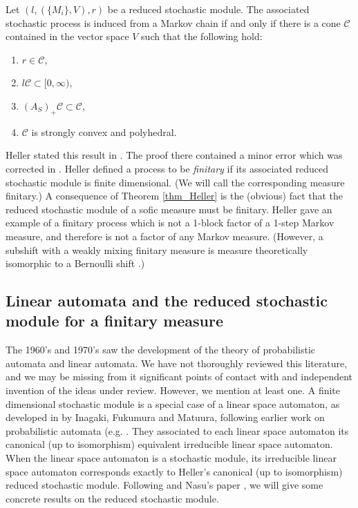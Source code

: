 \documentclass{kepart2010}
\theoremstyle{plain}
\theoremstyle{definition}
\theoremstyle{remark}
\theoremstyle{definition}
\numberwithin{equation}{section}
\begin{document}
\begin{thm}\label{thm_Heller}
Let $(l,(\{M_i\},V),r)$ be a reduced stochastic module.
The associated stochastic process is induced from a
Markov chain if and only if there is a cone $\mathcal C$
contained in the vector space $V$  such that the following hold:
\begin{enumerate}
\item
 $r\in \mathcal C$,
\item
 $l\mathcal C \subset [0,\infty )$,
\item
$(A_S)_+ \mathcal C \subset \mathcal C$,
\item
 $\mathcal C$ is strongly convex and  polyhedral.
\end{enumerate}
\end{thm}
Heller stated this result in \cite[Theorem 1]{Heller1965}. The proof
there contained a minor error which was corrected in
\cite{Heller1967}. Heller defined a process to be {\em finitary} if
its associated reduced stochastic module is finite dimensional. (We
will call the corresponding measure finitary.) A consequence of
Theorem \ref{thm_Heller} is the (obvious) fact that the reduced
stochastic module of a sofic measure must be finitary. Heller gave
an example \cite{Heller1965} of a finitary process which is not a
1-block factor of a 1-step Markov measure, and therefore is not a
factor of any Markov measure. {}{ (However, a subshift with a weakly
mixing finitary measure is measure theoretically isomorphic to a
Bernoulli shift \cite{BinkowskaKaminski1984}.) }

\subsection{Linear automata and the reduced stochastic
module for a finitary measure}
\label{redstochsofic}

The 1960's and 1970's saw the development of the theory of probabilistic
automata  and
linear automata. We have not thoroughly reviewed this literature, and
 we may be missing from it significant points of contact
with and independent invention of the ideas under review.
However, we mention at least one.
A  finite dimensional stochastic module is a special case of
a linear  space
automaton, as developed
in  \cite{InagakiFutumuraMutuura1972} by
Inagaki, Fukumura and
Matuura, following earlier work on probabilistic
automata (e.g. \cite{Paz1971,Rabin1963}.
They associated to each
linear  space
automaton  its canonical (up to isomorphism)
equivalent irreducible linear space automaton.
When the linear space automaton is a stochastic module,
its irreducible linear space automaton
 corresponds exactly to Heller's canonical
(up to isomorphism) reduced stochastic module. Following
\cite{InagakiFutumuraMutuura1972} and Nasu's paper \cite{Nasu1985},
we will give some concrete results on the reduced stochastic module.
\end{document}
